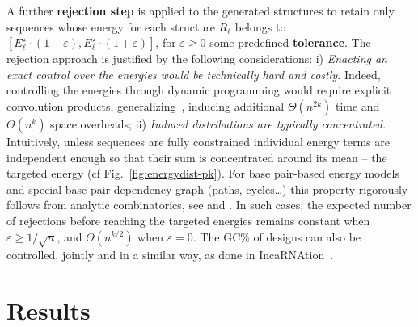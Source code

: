 \documentclass{bioinfo}
\newcommand{\Def}[1]{{\bfseries #1}}
\newcommand{\TargetE}{E^{\star}}
\newcommand{\Nuc}[1]{{\sf #1}}
\newcommand{\Cb}{\Nuc{C}}
\newcommand{\Gb}{\Nuc{G}}
\newcommand{\GCb}{\Gb\Cb}
\newcommand{\Software}[1]{{\ttfamily #1}}
\begin{document}
A further \Def{rejection step} is applied to the generated structures to retain only sequences whose energy for each structure $R_\ell$ belongs to $[\TargetE_\ell\cdot(1-\varepsilon),\TargetE_\ell\cdot(1+\varepsilon)]$, for $\varepsilon\ge 0$ some predefined \Def{tolerance}. The rejection approach is justified by the following considerations:
i) \emph{Enacting an exact control over the energies would  be technically hard and costly.} Indeed, controlling the energies through dynamic programming would require explicit convolution products, generalizing~\citet{Cupal1996}, inducing additional $\Theta(n^{2k})$ time and $\Theta(n^k)$ space overheads;
ii) \emph{Induced distributions are typically concentrated.} Intuitively, unless sequences are fully constrained individual energy terms are independent enough so that their sum is concentrated around its mean -- the targeted energy (cf Fig.~\ref{fig:energydist-pk}).
For base pair-based energy models and special base pair dependency graph
(paths, cycles\ldots) this property rigorously follows from analytic
combinatorics, see \citet{Bender1983} and
\citet{Drmota1997}. In such cases, the expected number of
rejections before reaching the targeted energies remains constant when
$\varepsilon\ge 1/\sqrt{n}$, and $\Theta(n^{k/2})$ when
$\varepsilon=0$. The \GCb\% of designs can also be controlled,
jointly and in a similar way, as done in
\Software{IncaRNAtion}~\citep{Reinharz2013}.


\section{Results}\label{sec:results}
\end{document}
